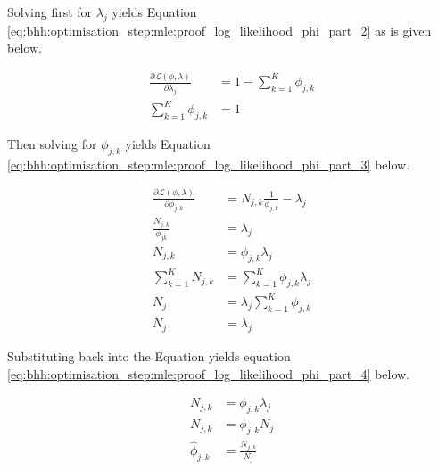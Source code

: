 Solving first for $\lambda_{j}$ yields Equation \ref{eq:bhh:optimisation_step:mle:proof_log_likelihood_phi_part_2} as is given below.

\begin{equation}
      \label{eq:bhh:optimisation_step:mle:proof_log_likelihood_phi_part_2}
      \begin{split}
            \frac{\partial \mathcal{L}(\phi, \lambda)}{\partial \lambda_{j}} &= 1 - \sum_{k=1}^{K} \phi_{j,k}  \\
            \sum_{k=1}^{K} \phi_{j,k}  &= 1
      \end{split}
\end{equation}

Then solving for $\phi_{j,k}$ yields Equation \ref{eq:bhh:optimisation_step:mle:proof_log_likelihood_phi_part_3} below.

\begin{equation}
      \label{eq:bhh:optimisation_step:mle:proof_log_likelihood_phi_part_3}
      \begin{split}
            \frac{\partial \mathcal{L}(\phi, \lambda)}{\partial \phi_{j,k}} &= N_{j,k} \frac{1}{\phi_{j,k}}  - \lambda_{j} \\
            \frac{N_{j,k}}{\phi_{jk}} &= \lambda_{j} \\
            N_{j,k} &= \phi_{j,k} \lambda_{j} \\
            \sum_{k=1}^{K} N_{j,k} &= \sum_{k=1}^{K} \phi_{j,k} \lambda_{j} \\
            N_{j} &= \lambda_{j} \sum_{k=1}^{K} \phi_{j,k} \\
            N_{j} &= \lambda_{j}
      \end{split}
\end{equation}

Substituting back into the Equation yields equation \ref{eq:bhh:optimisation_step:mle:proof_log_likelihood_phi_part_4} below.

\begin{equation}
      \label{eq:bhh:optimisation_step:mle:proof_log_likelihood_phi_part_4}
      \begin{split}
            N_{j,k} &= \phi_{j,k} \lambda_{j} \\
            N_{j,k} &= \phi_{j,k} N_{j} \\
            \hat{\phi}_{j,k} &= \frac{N_{j,k}}{N_{j}}\\
      \end{split}
\end{equation}

